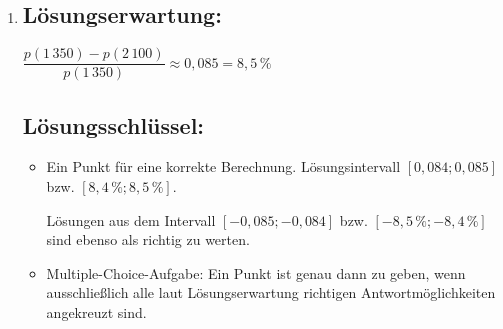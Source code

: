 \begin{langesbeispiel}
{\begin{enumerate}
		$S'=(750|1\,350)$
	 	
	\subsection{Lösungsschlüssel:}
	\begin{itemize}
		\item  Ein Ausgleichspunkt für die korrekte Berechnung.
		
		Lösungsintervall: $[19^\circ;19,2^\circ]$ bzw. $[0,33\,\text{rad};0,335\,\text{rad}]$
		\item Ein Punkt für die korrekte Berechnung.
	\end{itemize}
	
	\item \subsection{Lösungserwartung:}
			
		$\dfrac{p(1\,350)-p(2\,100)}{p(1\,350)}\approx 0,085=8,5\,\%$
		
	\subsection{Lösungsschlüssel:}
	
\begin{itemize}
	\item  Ein Punkt für eine korrekte Berechnung. Lösungsintervall $[0,084;0,085]$ bzw. $[8,4\,\%;8,5\,\%]$.
	
	Lösungen aus dem Intervall $[-0,085;-0,084]$ bzw. $[-8,5\,\%;-8,4\,\%]$ sind ebenso als richtig zu werten.
	\item  Multiple-Choice-Aufgabe: Ein Punkt ist genau dann zu geben, wenn ausschließlich alle laut Lösungserwartung richtigen Antwortmöglichkeiten angekreuzt sind.

\end{itemize}

\end{enumerate}}
		\end{langesbeispiel}